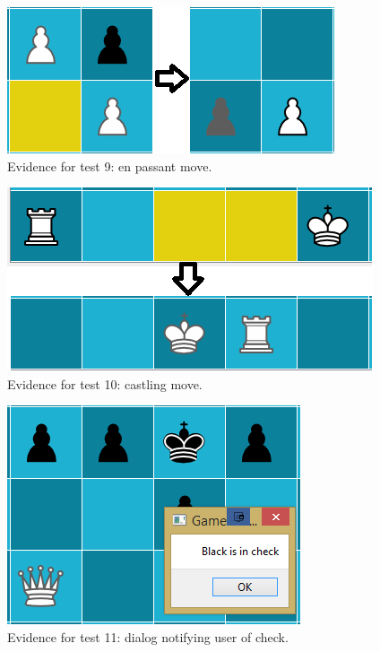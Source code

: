 \begin{figure}
	\centering
	\includegraphics{images/screenshots/test-9}
	\caption{Evidence for test 9: en passant move.}
	\label{test-9}
\end{figure}
\begin{figure}
	\centering
	\includegraphics{images/screenshots/test-10}
	\caption{Evidence for test 10: castling move.}
	\label{test-10}
\end{figure}
\begin{figure}
	\centering
	\includegraphics{images/screenshots/test-11}
	\caption{Evidence for test 11: dialog notifying user of check.}
	\label{test-11}
\end{figure}
